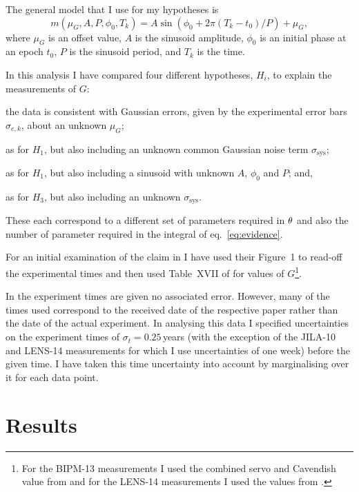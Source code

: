 \documentclass[doublecol]{epl2}
\begin{document}
The general model that I use for my hypotheses is
\begin{equation}\label{eq:model}
 m(\mu_G, A, P, \phi_0, T_k) = A\sin{(\phi_0 + 2\pi (T_k-t_0)/P)} + \mu_G,
\end{equation}
where $\mu_G$ is an offset value, $A$ is the sinusoid amplitude, $\phi_0$ is an initial phase at an epoch $t_0$,
$P$ is the sinusoid period, and $T_k$ is the time.

In this analysis I have compared four different hypotheses, $H_i$, to explain the measurements of $G$:
\begin{enumerate*}[label=$H_{\arabic*}$\upshape)]
 \item the data is consistent with Gaussian errors, given by the experimental error bars $\sigma_{e,k}$, about an 
 unknown $\mu_G$;
 \item as for $H_1$, but also including an unknown common Gaussian noise term $\sigma_{\mathrm{sys}}$;
 \item as for $H_1$, but also including a sinusoid with unknown $A$, $\phi_0$ and $P$; and, 
 \item as for $H_3$, but also including an unknown $\sigma_{\mathrm{sys}}$.
\end{enumerate*}
These each correspond to a different set of parameters required in $\mathbf{\theta}$ and also the number of
parameter required in the integral of eq.~\ref{eq:evidence}.

For an initial examination of the claim in \cite{2015EL....11010002A} I have used their Figure~1 to read-off
the experimental times and then used Table~XVII of \cite{RevModPhys.84.1527} for values of $G$\footnote{For
the BIPM-13 measurements I used the combined servo and Cavendish value from \cite{PhysRevLett.113.039901}
and for the LENS-14 measurements I used the values from \cite{2014Natur.510..518R}.}.

In \cite{2015EL....11010002A} the experiment times are given no associated error.
However, many of the times used correspond to the received date of the respective paper rather than the
date of the actual experiment.  In analysing this data I specified uncertainties on the experiment times of
$\sigma_{t} = 0.25$\,years (with the exception of the JILA-10 and LENS-14 measurements for which I use uncertainties
of one week) before the given time. I have taken this time uncertainty into account by marginalising over
it for each data point.

\section{Results}
\end{document}
